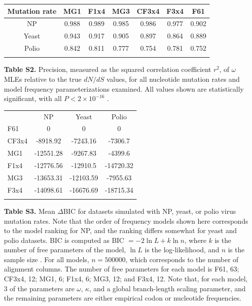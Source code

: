 \documentclass[11pt]{article}
\begin{document}
\begin{table}[htbp]
	\begin{tabular}{c c c c c c c}
		\hline\noalign{\smallskip}
		Mutation rate & MG1 & F1x4 & MG3 & CF3x4 & F3x4 & F61 \\
		\hline\noalign{\smallskip}
		NP & 0.988 & 0.989 & 0.985 & 0.986 & 0.977 & 0.902 \\ 
		Yeast & 0.943 & 0.917 & 0.905 & 0.897 & 0.864 & 0.889 \\ 
		Polio & 0.842 & 0.811 & 0.777 & 0.754 & 0.781 & 0.752 \\ 
		\noalign{\smallskip}\hline\noalign{\smallskip}
	\end{tabular}
\end{table}	
\noindent \textbf{Table S2.} Precision, measured as the squared correlation coefficient $r^2$, of $\omega$ MLEs relative to the true $dN/dS$ values, for all nucleotide mutation rates and model frequency parameterizations examined. All values shown are statistically significant, with all $P < 2\times10^{-16}$ .



\vspace{2.5cm}


\begin{table}[htbp]
	\begin{tabular}{l c c c}
		\hline\noalign{\smallskip}
		\multicolumn{1}{c}{Frequencies} & NP & Yeast & Polio \\
		\noalign{\smallskip}\hline\noalign{\smallskip}
            F61 & 0 & 0 & 0 \\ 
            CF3x4 & -8918.92 & -7243.16 & -7306.7 \\ 
            MG1 & -12551.28 & -9267.83 & -4399.6 \\ 
            F1x4 & -12776.56 & -12910.5 & -14720.32 \\ 
            MG3 & -13653.31 & -12103.59 & -7955.63 \\ 
            F3x4 & -14098.61 & -16676.69 & -18715.34 \\ 
		\noalign{\smallskip}\hline\noalign{\smallskip} 
	\end{tabular}
\end{table}
\noindent \textbf{Table S3.} Mean $\Delta$BIC for datasets simulated with NP, yeast, or polio virus mutation rates. Note that the order of frequency models shown here corresponds to the model ranking for NP, and the ranking differs somewhat for yeast and polio datasets. BIC is computed as BIC $= -2\ln L + k\ln n$, where $k$ is the number of free parameters of the model, $\ln L$ is the log-likelihood, and $n$ is the sample size \citep{BurnhamAnderson2004}. For all models, $n=500000$, which corresponds to the number of alignment columns. The number of free parameters for each model is F61, 63; CF3x4, 12; MG1, 6; F1x4, 6; MG3, 12; and F3x4, 12. Note that, for each model, 3 of the parameters are $\omega$, $\kappa$, and a global branch-length scaling parameter, and the remaining parameters are either empirical codon or nucleotide frequencies.
\end{document}
